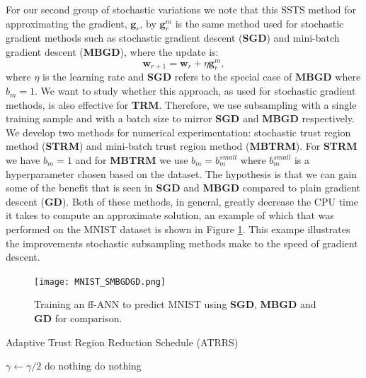 \documentclass[letterpaper,12pt,titlepage,oneside,final]{book}
\begin{document}
	For our second group of stochastic variations we note that this SSTS method for approximating the gradient, $\mathbf{g}_{r}$, by $\mathbf{g}_{r}^{m}$ is the same method used for stochastic gradient methods such as stochastic gradient descent (\textbf{SGD}) and mini-batch gradient descent (\textbf{MBGD}), where the update is:
	\begin{equation}
	\mathbf{w}_{r+1} = \mathbf{w}_{r} + \eta \mathbf{g}_{r}^{m}, 
	\end{equation}
	where $\eta$ is the learning rate and \textbf{SGD} refers to the special case of $\mathbf{MBGD}$ where $b_{m} = 1$. We want to study whether this approach, as used for stochastic gradient methods, is also effective for \textbf{TRM}. Therefore, we use subsampling with a single training sample and with a batch size to mirror \textbf{SGD} and \textbf{MBGD} respectively. We develop two methods for numerical experimentation: stochastic trust region method (\textbf{STRM}) and mini-batch trust region method (\textbf{MBTRM}). For \textbf{STRM} we have $b_{m} = 1$ and for \textbf{MBTRM} we use $b_{m} = b_{m}^{small}$ where $b_{m}^{small}$ is a hyperparameter chosen based on the dataset. The hypothesis is that we can gain some of the benefit that is seen in \textbf{SGD} and \textbf{MBGD} compared to plain gradient descent (\textbf{GD}). Both of these methods, in general, greatly decrease the CPU time it takes to compute an approximate solution, an example of which that was performed on the MNIST dataset \cite{mnist} is shown in Figure \ref{figure:SMBGDGD}. This exampe illustrates the improvements stochastic subsampling methods make to the speed of gradient descent.
	
	\begin{figure}[h]
		\centering
		\texttt{[image: MNIST\_SMBGDGD.png]}
		\caption{Training an ff-ANN to predict MNIST using \textbf{SGD}, \textbf{MBGD} and \textbf{GD} for comparison. }
		\label{figure:SMBGDGD}
	\end{figure}
	
	\begin{algorithm}
		\caption{Adaptive Trust Region Reduction Schedule (ATRRS)}
		\begin{algorithmic}[1]
			\State $\gamma \gets \gamma / 2$
			\Else
			\State do nothing
			\EndIf
			\Else
			\State do nothing
			\EndIf
			\EndFunction
		\end{algorithmic}	
		\label{algorithm:assrs-simple}	
	\end{algorithm}
	
\end{document}
